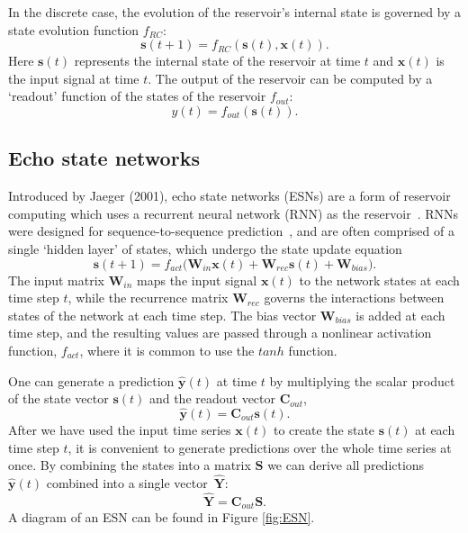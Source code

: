 In the discrete case, the evolution of the reservoir's internal state is governed by a state evolution function $f_{RC}$:
\[
    \mathbf{s}(t+1) = f_{RC}(\mathbf{s}(t), \mathbf{x}(t)).
\]
Here $\mathbf{s}(t)$ represents the internal state of the reservoir at time $t$ and $\mathbf{x}(t)$ is the input signal at time $t$. The output of the reservoir can be computed by a `readout' function of the states of the reservoir $f_{out}$:
\[
    y(t) = f_{out}(\mathbf{s}(t)).
\]

\subsection{Echo state networks}


Introduced by Jaeger (2001), echo state networks (ESNs) are a form of reservoir computing which uses a recurrent neural network (RNN) as the reservoir~\cite{jaeger_2001}. RNNs were designed for sequence-to-sequence prediction~\cite{lukosevicius_and_jaeger_2009}, and are often comprised of a single `hidden layer' of states, which undergo the state update equation
\begin{equation*}\label{eq:esn_state_update}
    \mathbf{s}(t + 1) = f_{act}\bigl(\mathbf{W}_{in}\mathbf{x}(t) + \mathbf{W}_{rec}\mathbf{s}(t) + \mathbf{W}_{bias}\bigr).
\end{equation*}
The input matrix $\mathbf{W}_{in}$ maps the input signal $\mathbf{x}(t)$ to the network states at each time step $t$, while the recurrence matrix $\mathbf{W}_{rec}$ governs the interactions between states of the network at each time step. The bias vector $\mathbf{W}_{bias}$ is added at each time step, and the resulting values are passed through a nonlinear activation function, $f_{act}$, where it is common to use the $tanh$ function.

One can generate a prediction $\mathbf{\hat{y}}(t)$ at time $t$ by multiplying the scalar product of the state vector $\mathbf{s}(t)$ and the readout vector $\mathbf{C}_{out}$,
\[
    \mathbf{\hat{y}}(t) = \mathbf{C}_{out}\mathbf{s}(t).
\]
After we have used the input time series $\mathbf{x}(t)$ to create the state $\mathbf{s}(t)$ at each time step $t$, it is convenient to generate predictions over the whole time series at once. By combining the states into a matrix $\mathbf{S}$ we can derive all predictions $\mathbf{\hat{y}}(t)$ combined into a single vector~$\mathbf{\hat{Y}}$:
\[
    \mathbf{\hat{Y}} = \mathbf{C}_{out}\mathbf{S}.
\]
A diagram of an ESN can be found in Figure \ref{fig:ESN}.

